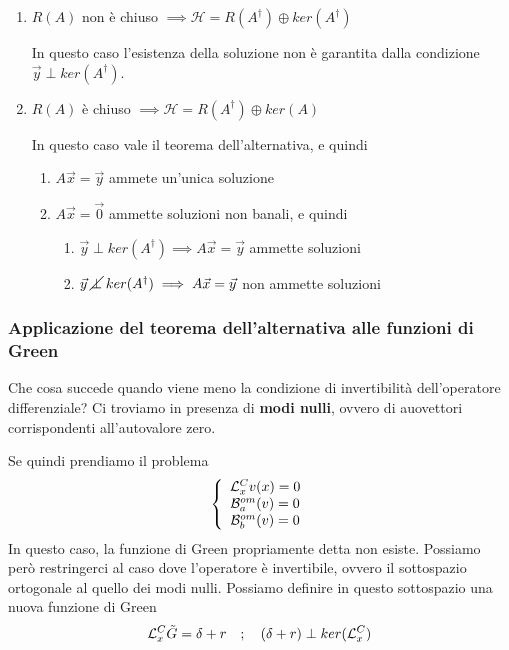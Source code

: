\begin{enumerate}
	\item $R(A)$ non è chiuso $\implies \mathcal{H} = R(A^\dagger) \oplus ker(A^\dagger)$
	
	In questo caso l'esistenza della soluzione non è garantita dalla condizione $\vec{y} \perp ker(A^\dagger)$.
	
	\item $R(A)$ è chiuso $\implies \mathcal{H} = R(A^\dagger) \oplus ker(A)$
	
	In questo caso vale il teorema dell'alternativa, e quindi
	\begin{enumerate}
		\item $A \vec{x} = \vec{y}$ ammete un'unica soluzione
		
		\item $A \vec{x} = \vec{0}$ ammette soluzioni non banali, e quindi		
			\begin{enumerate}
				\item $\vec{y} \perp ker(A^\dagger) \implies A \vec{x} = \vec{y}$ ammette soluzioni
				\item $\vec{y} \; \cancel{\perp} \; ker(A^\dagger) \implies A \vec{x} = \vec{y}$ non ammette soluzioni
			\end{enumerate}
	\end{enumerate}
\end{enumerate}


\subsubsection{Applicazione del teorema dell'alternativa alle funzioni di Green}

Che cosa succede quando viene meno la condizione di invertibilità dell'operatore differenziale? Ci troviamo in presenza di \textbf{modi nulli}, ovvero di auovettori corrispondenti all'autovalore zero. 

Se quindi prendiamo il problema
\begin{align}
	\left\{ \begin{array}{ccc} \mathcal{L}_x^C v(x)=0\\ \mathcal{B}_a^{om}(v) = 0\\ \mathcal{B}_b^{om}(v) = 0 \end{array} \right.
\end{align}
In questo caso, la funzione di Green propriamente detta non esiste. Possiamo però restringerci al caso dove l'operatore è invertibile, ovvero il sottospazio ortogonale al quello dei modi nulli. 
Possiamo definire in questo sottospazio una nuova funzione di Green
\begin{align}
	\mathcal{L}_x^C \tilde{G} = \delta + r \quad ; \quad (\delta + r) \perp ker(\mathcal{L}_x^C) 
\end{align}

